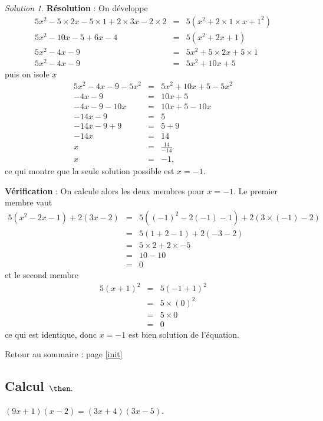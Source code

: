 \documentclass[14pt]{article}
\theoremstyle{remark}
\newtheorem*{sol}{Solution}
\newcounter{n}
\renewcommand{\it}{Retour au sommaire : page \ref{init}
	\subsection{Calcul $ \mathbf{ \then}.$}\label{\then} \stepcounter{n} }
\theoremstyle{plain}
\begin{document}
\begin{sol}
\textbf{Résolution} : On développe 
\begin{eqnarray*}
5x^2-5\times2x-5\times 1 + 2\times 3x-2\times 2 &=& 
5(x^2+2\times1\times x+1^2)\\
5x^2 - 10x - 5 + 6x - 4 &=& 5(x^2 + 2x+1)\\
5x^2 -4x - 9 &=& 5x^2+5\times 2x + 5\times 1\\
5x^2-4x-9 &=& 5x^2 + 10x + 5
\end{eqnarray*}
puis on isole $x$ 
\begin{eqnarray*}
5x^2-4x-9 -5x^2 &=& 5x^2+10x+5-5x^2\\
-4x-9  &=& 10x+5\\
-4x - 9 - 10x&=& 10x+5-10x\\
-14x-9 &=& 5 \\
-14x-9+9&=& 5+9 \\
-14x&=& 14\\
x&=& \frac{14}{-14}\\
x&=&-1,\end{eqnarray*} ce qui montre que la seule solution 
possible est $x=-1$.

\textbf{Vérification} : On calcule alors les deux membres pour $x=-1$. Le premier membre vaut 
\begin{eqnarray*} 5(x^2-2x-1)+2(3x-2)&=& 
5((-1)^2 -2(-1) -1) + 2(3\times(-1)-2) \\
&=& 5(1+2-1) + 2(-3-2) \\
&=&5\times 2 + 2\times -5 \\
&=& 10 -10 \\
&=&0\end{eqnarray*}
et le second membre \begin{eqnarray*}
5(x+1)^2 &=& 5(-1+1)^2 \\
&=& 5\times (0)^2\\
&=& 5\times 0 \\
&=&0\end{eqnarray*}
ce qui est identique, donc $x=-1$ est bien solution de l'équation.
\end{sol}
\it $(9x+1)(x-2)=(3x+4)(3x-5)$.
\end{document}
